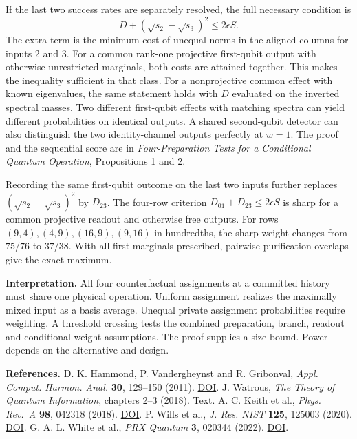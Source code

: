 \documentclass[
  10pt,
  a4paper,
]{article}
\begin{document}
If the last two success rates are separately resolved, the full necessary condition is \[
 D+(\sqrt{s_2}-\sqrt{s_3})^2\le2\epsilon S .
\] The extra term is the minimum cost of unequal norms in the aligned columns for inputs 2 and 3. For a common rank-one projective first-qubit output with otherwise unrestricted marginals, both costs are attained together. This makes the inequality sufficient in that class. For a nonprojective common effect with known eigenvalues, the same statement holds with \(D\) evaluated on the inverted spectral masses. Two different first-qubit effects with matching spectra can yield different probabilities on identical outputs. A shared second-qubit detector can also distinguish the two identity-channel outputs perfectly at \(w=1\). The proof and the sequential score are in \emph{Four-Preparation Tests for a Conditional Quantum Operation}, Propositions 1 and 2.

Recording the same first-qubit outcome on the last two inputs further replaces \((\sqrt{s_2}-\sqrt{s_3})^2\) by \(D_{23}\). The four-row criterion \(D_{01}+D_{23}\le2\epsilon S\) is sharp for a common projective readout and otherwise free outputs. For rows \((9,4),(4,9),(16,9),(9,16)\) in hundredths, the sharp weight changes from \(75/76\) to \(37/38\). With all first marginals prescribed, pairwise purification overlaps give the exact maximum.

\textbf{Interpretation.} All four counterfactual assignments at a committed history must share one physical operation. Uniform assignment realizes the maximally mixed input as a basis average. Unequal private assignment probabilities require weighting. A threshold crossing tests the combined preparation, branch, readout and conditional weight assumptions. The proof supplies a size bound. Power depends on the alternative and design.

\textbf{References.} D. K. Hammond, P. Vandergheynst and R. Gribonval, \emph{Appl. Comput. Harmon. Anal.} \textbf{30}, 129--150 (2011). \href{https://doi.org/10.1016/j.acha.2010.04.005}{DOI}. J. Watrous, \emph{The Theory of Quantum Information}, chapters 2--3 (2018). \href{https://cs.uwaterloo.ca/~watrous/TQI/}{Text}. A. C. Keith et al., \emph{Phys. Rev.~A} \textbf{98}, 042318 (2018). \href{https://doi.org/10.1103/PhysRevA.98.042318}{DOI}. P. Wills et al., \emph{J. Res. NIST} \textbf{125}, 125003 (2020). \href{https://doi.org/10.6028/jres.125.003}{DOI}. G. A. L. White et al., \emph{PRX Quantum} \textbf{3}, 020344 (2022). \href{https://doi.org/10.1103/PRXQuantum.3.020344}{DOI}.
\end{document}
